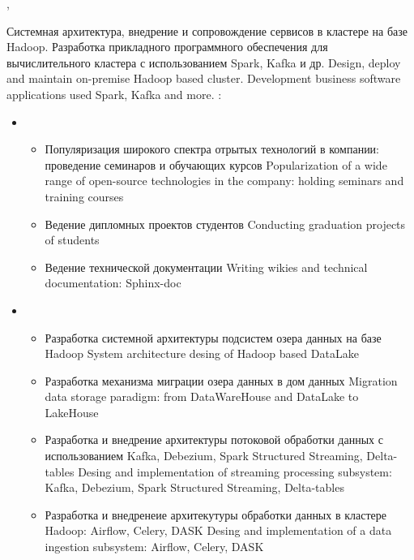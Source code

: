 \documentclass[11pt,a4paper,sans]{moderncv}        %
\begin{document}
{\protect{}}
{\cityspb, \country}
{}
{
	{Системная архитектура, внедрение и сопровождение сервисов в кластере на базе Hadoop. Разработка прикладного программного обеспечения для вычислительного кластера с использованием Spark, Kafka и др.}
	{Design, deploy and maintain on-premise Hadoop based cluster. Development business software
	applications used Spark, Kafka and more.}
	\newline{}
	\achievements:
	\begin{itemize}
		\item {}
		\begin{itemize}
			\item {}
				{Популяризация широкого спектра отрытых технологий в компании: проведение семинаров и обучающих курсов}
				{Popularization of a wide range of open-source technologies in the company: holding seminars and training courses }
			\item {}
				{Ведение дипломных проектов студентов}
				{Conducting graduation projects of students}
			\item {}
				{Ведение технической документации}
				{Writing wikies and technical documentation: Sphinx-doc}
		\end{itemize}
		\item {}
		\begin{itemize}
			\item {}
				{Разработка системной архитектуры подсистем озера данных на базе Hadoop}
				{System architecture desing of Hadoop based DataLake}
			\item {}
				{Разработка механизма миграции озера данных в дом данных}
				{Migration data storage paradigm: from DataWareHouse and DataLake to LakeHouse }
			\item {}
				{Разработка и внедрение архитектуры потоковой обработки данных с использованием Kafka, Debezium, Spark Structured Streaming, Delta-tables}
				{Desing and implementation of streaming processing subsystem: Kafka, Debezium, Spark Structured Streaming, Delta-tables}
			\item {}
				{Разработка и внедренеие архитекутуры обработки данных в кластере Hadoop: Airflow, Celery, DASK}
				{Desing and implementation of a data ingestion subsystem: Airflow, Celery, DASK}

\end{itemize}
\end{itemize}}
\end{document}
